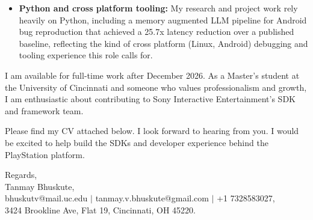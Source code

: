 \documentclass[11pt]{letter}
\begin{document}
\begin{letter}{}
\begin{itemize}[leftmargin=*, itemsep=0.45em]
    \item \textbf{Python and cross platform tooling:} My research and project work rely heavily on Python, including a memory augmented LLM pipeline for Android bug reproduction that achieved a 25.7x latency reduction over a published baseline, reflecting the kind of cross platform (Linux, Android) debugging and tooling experience this role calls for.
\end{itemize}

I am available for full-time work after December 2026. As a Master's student at the University of Cincinnati and someone who values professionalism and growth, I am enthusiastic about contributing to Sony Interactive Entertainment's SDK and framework team.

Please find my CV attached below. I look forward to hearing from you. I would be excited to help build the SDKs and developer experience behind the PlayStation platform.

{\setlength{\parskip}{0pt}
Regards,\\
Tanmay Bhuskute,\\
bhuskutv@mail.uc.edu $\mid$ tanmay.v.bhuskute@gmail.com $\mid$ +1 7328583027,\\
3424 Brookline Ave, Flat 19, Cincinnati, OH 45220.
}

\end{letter}
\end{document}

